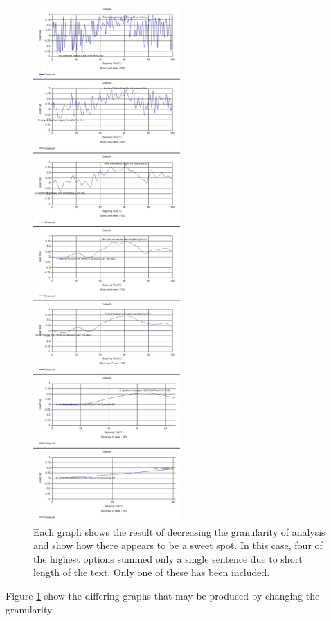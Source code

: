 \documentclass{article}
\begin{document}
        \begin{figure}
            \includegraphics[width=0.5\textwidth]{Figures/Blocksize/Cinderella/cinderellaGran}
            \centering
            \caption{Each graph shows the result of decreasing the granularity of analysis and show how there appears to be a sweet spot. In this case, four of the highest options summed only a single sentence due to short length of the text. Only one of these has been included.}
            \label{fig:cinderellaGran}
        \end{figure}
        Figure \ref{fig:cinderellaGran} show the differing graphs that may be produced by changing the granularity.
\end{document}

